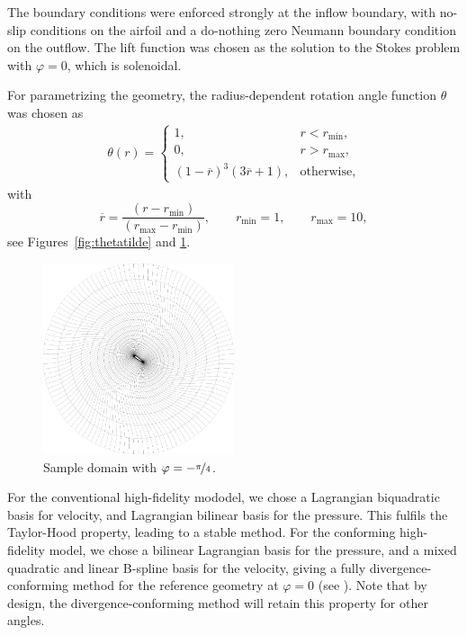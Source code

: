 \documentclass[onecolumn, twoside, a4paper, 11pt]{article}
\begin{document}
The boundary conditions were enforced strongly at the inflow boundary,
with no-slip conditions on the airfoil and a do-nothing zero Neumann
boundary condition on the outflow. The lift function was chosen as the
solution to the Stokes problem with $\varphi=0$, which is solenoidal.

For parametrizing the geometry, the radius-dependent rotation angle function
$\theta$ was chosen as
\begin{align}
  \theta(r) = \begin{cases}
    1, & r < r_\text{min}, \\
    0, & r > r_\text{max}, \\
    (1-\overline{r})^3 (3\overline{r}+1), & \text{otherwise},
  \end{cases}
\end{align}
with
\[
  \overline{r} = \frac{(r - r_\text{min})}{(r_\text{max} - r_\text{min})},
  \qquad r_\text{min} = 1, \qquad r_\text{max} = 10,
\]
see Figures~\ref{fig:thetatilde} and \ref{fig:domain}.

\begin{figure}
  \begin{center}
    \includegraphics[width=0.5\textwidth]{figs/domain}
  \end{center}
  \caption{Sample domain with $\varphi = -\nicefrac{\pi}{4}$.}
  \label{fig:domain}
\end{figure}

For the conventional high-fidelity mododel, we chose a Lagrangian biquadratic basis for velocity,
and Lagrangian bilinear basis for the pressure. This fulfils the Taylor-Hood property, leading to a
stable method. For the conforming high-fidelity model, we chose a bilinear Lagrangian basis for the
pressure, and a mixed quadratic and linear B-spline basis for the velocity, giving a fully
divergence-conforming method for the reference geometry at $\varphi=0$ (see
\cite{Evans2013idc1}). Note that by design, the divergence-conforming method will retain this
property for other angles.
\end{document}
